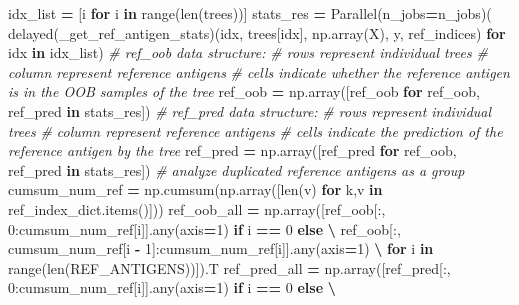 \documentclass[
  11pt,
  oneside]{book}
\newenvironment{Shaded}{\begin{snugshade}}{\end{snugshade}}
\newcommand{\BuiltInTok}[1]{#1}
\newcommand{\CommentTok}[1]{\textcolor[rgb]{0.56,0.35,0.01}{\textit{#1}}}
\newcommand{\ControlFlowTok}[1]{\textcolor[rgb]{0.13,0.29,0.53}{\textbf{#1}}}
\newcommand{\DecValTok}[1]{\textcolor[rgb]{0.00,0.00,0.81}{#1}}
\newcommand{\KeywordTok}[1]{\textcolor[rgb]{0.13,0.29,0.53}{\textbf{#1}}}
\newcommand{\NormalTok}[1]{#1}
\newcommand{\OperatorTok}[1]{\textcolor[rgb]{0.81,0.36,0.00}{\textbf{#1}}}
\begin{document}
\begin{Shaded}
\begin{Highlighting}[]
\NormalTok{        idx\_list }\OperatorTok{=}\NormalTok{ [i }\ControlFlowTok{for}\NormalTok{ i }\KeywordTok{in} \BuiltInTok{range}\NormalTok{(}\BuiltInTok{len}\NormalTok{(trees))]}
\NormalTok{        stats\_res }\OperatorTok{=}\NormalTok{ Parallel(n\_jobs}\OperatorTok{=}\NormalTok{n\_jobs)(}
\NormalTok{                    delayed(\_get\_ref\_antigen\_stats)(idx, trees[idx], np.array(X), y, ref\_indices) }\ControlFlowTok{for}\NormalTok{ idx }\KeywordTok{in}\NormalTok{ idx\_list)}
        \CommentTok{\# ref\_oob data structure:}
        \CommentTok{\# rows represent individual trees}
        \CommentTok{\# column represent reference antigens}
        \CommentTok{\# cells indicate whether the reference antigen is in the OOB samples of the tree}
\NormalTok{        ref\_oob }\OperatorTok{=}\NormalTok{ np.array([ref\_oob }\ControlFlowTok{for}\NormalTok{ ref\_oob, ref\_pred }\KeywordTok{in}\NormalTok{ stats\_res])}
        \CommentTok{\# ref\_pred data structure:}
        \CommentTok{\# rows represent individual trees}
        \CommentTok{\# column represent reference antigens}
        \CommentTok{\# cells indicate the prediction of the reference antigen by the tree}
\NormalTok{        ref\_pred }\OperatorTok{=}\NormalTok{ np.array([ref\_pred }\ControlFlowTok{for}\NormalTok{ ref\_oob, ref\_pred }\KeywordTok{in}\NormalTok{ stats\_res])}
        \CommentTok{\# analyze duplicated reference antigens as a group}
\NormalTok{        cumsum\_num\_ref }\OperatorTok{=}\NormalTok{ np.cumsum(np.array([}\BuiltInTok{len}\NormalTok{(v) }\ControlFlowTok{for}\NormalTok{ k,v }\KeywordTok{in}\NormalTok{ ref\_index\_dict.items()]))}
\NormalTok{        ref\_oob\_all }\OperatorTok{=}\NormalTok{ np.array([ref\_oob[:, }\DecValTok{0}\NormalTok{:cumsum\_num\_ref[i]].}\BuiltInTok{any}\NormalTok{(axis}\OperatorTok{=}\DecValTok{1}\NormalTok{) }\ControlFlowTok{if}\NormalTok{ i }\OperatorTok{==} \DecValTok{0} \ControlFlowTok{else} \OperatorTok{\textbackslash{}}
\NormalTok{                                ref\_oob[:, cumsum\_num\_ref[i }\OperatorTok{{-}} \DecValTok{1}\NormalTok{]:cumsum\_num\_ref[i]].}\BuiltInTok{any}\NormalTok{(axis}\OperatorTok{=}\DecValTok{1}\NormalTok{) }\OperatorTok{\textbackslash{}}
                                \ControlFlowTok{for}\NormalTok{ i }\KeywordTok{in} \BuiltInTok{range}\NormalTok{(}\BuiltInTok{len}\NormalTok{(REF\_ANTIGENS))]).T}
\NormalTok{        ref\_pred\_all }\OperatorTok{=}\NormalTok{ np.array([ref\_pred[:, }\DecValTok{0}\NormalTok{:cumsum\_num\_ref[i]].}\BuiltInTok{any}\NormalTok{(axis}\OperatorTok{=}\DecValTok{1}\NormalTok{) }\ControlFlowTok{if}\NormalTok{ i }\OperatorTok{==} \DecValTok{0} \ControlFlowTok{else} \OperatorTok{\textbackslash{}}

\end{Highlighting}
\end{Shaded}
\end{document}
